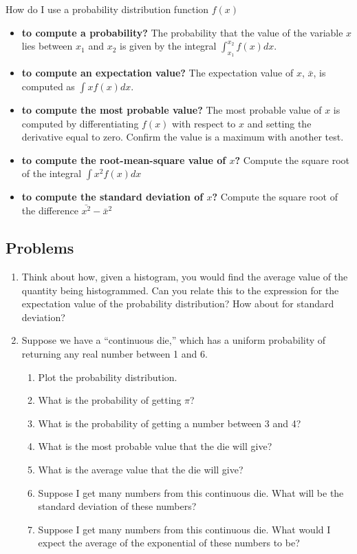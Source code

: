 \documentclass[12pt]{book}
\begin{document}
\noindent How do I use a probability distribution function $f (x)$

\begin{itemize}
 \item {\bf to compute a probability? } The probability that the value of the variable $x$ lies between $x_1$ and $x_2$ is given by the integral $\int_{x_1}^{x_2} f(x) dx.$
 \item {\bf to compute an expectation value?} The expectation value of $x$, $\bar{x}$, is computed as $\int x f (x)dx.$
 \item {\bf to compute the most probable value?} The most probable value of $x$ is computed by differentiating $f (x)$ with respect to $x$ and setting the derivative equal to zero. Confirm the value is a maximum with another test.
 \item {\bf to compute the root-mean-square value of $x$?} Compute the square root of the integral $\int x^2 f(x) dx$
 \item {\bf to compute the standard deviation of $x$?} Compute the square root of the difference $\bar{x^2}-\bar{x}^2$

\end{itemize}

\pagebreak

\subsection{Problems}
\begin{enumerate}
 \item Think about how, given a histogram, you would find the average value of the quantity being histogrammed. Can you relate this to the expression for the expectation value of the probability distribution? How about for standard deviation?

 \item Suppose we have a ``continuous die,'' which has a uniform probability of returning any real number between 1 and 6.
 \begin{enumerate}
 \item Plot the probability distribution.
 \item What is the probability of getting $\pi$?
 \item What is the probability of getting a number between 3 and 4?
 \item What is the most probable value that the die will give?
 \item What is the average value that the die will give?
 \item Suppose I get many numbers from this continuous die. What will be the standard deviation of these numbers?
 \item Suppose I get many numbers from this continuous die. What would I expect the average of the exponential of these numbers to be?
 \end{enumerate}
\end{enumerate}
\end{document}
